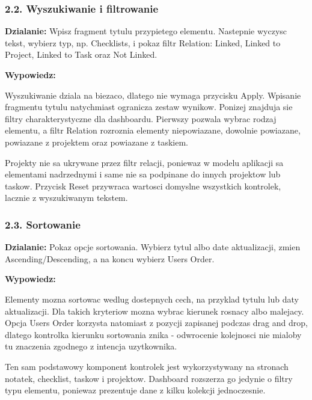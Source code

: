 \documentclass[
  polish,
  12pt,
  a4paper,
]{article}
\renewenvironment{quote}
  {\list{}{\leftmargin=1.2em\rightmargin=0.6em}%
   \item\relax\color{black}\setlength{\parskip}{0.7em}}
  {\endlist}
\begin{document}
\subsubsection{2.2. Wyszukiwanie i
filtrowanie}\label{22-wyszukiwanie-i-filtrowanie}

\textbf{Dzialanie:} Wpisz fragment tytulu przypietego elementu.
Nastepnie wyczysc tekst, wybierz typ, np. Checklists, i pokaz filtr
Relation: Linked, Linked to Project, Linked to Task oraz Not Linked.

\textbf{Wypowiedz:}

\begin{quote}
Wyszukiwanie dziala na biezaco, dlatego nie wymaga przycisku Apply.
Wpisanie fragmentu tytulu natychmiast ogranicza zestaw wynikow. Ponizej
znajduja sie filtry charakterystyczne dla dashboardu. Pierwszy pozwala
wybrac rodzaj elementu, a filtr Relation rozroznia elementy
niepowiazane, dowolnie powiazane, powiazane z projektem oraz powiazane z
taskiem.

Projekty nie sa ukrywane przez filtr relacji, poniewaz w modelu
aplikacji sa elementami nadrzednymi i same nie sa podpinane do innych
projektow lub taskow. Przycisk Reset przywraca wartosci domyslne
wszystkich kontrolek, lacznie z wyszukiwanym tekstem.
\end{quote}

\subsubsection{2.3. Sortowanie}\label{23-sortowanie}

\textbf{Dzialanie:} Pokaz opcje sortowania. Wybierz tytul albo date
aktualizacji, zmien Ascending/\allowbreak Descending, a na koncu wybierz
User\textquotesingle s Order.

\textbf{Wypowiedz:}

\begin{quote}
Elementy mozna sortowac wedlug dostepnych cech, na przyklad tytulu lub
daty aktualizacji. Dla takich kryteriow mozna wybrac kierunek rosnacy
albo malejacy. Opcja User\textquotesingle s Order korzysta natomiast z
pozycji zapisanej podczas drag and drop, dlatego kontrolka kierunku
sortowania znika - odwrocenie kolejnosci nie mialoby tu znaczenia
zgodnego z intencja uzytkownika.

Ten sam podstawowy komponent kontrolek jest wykorzystywany na stronach
notatek, checklist, taskow i projektow. Dashboard rozszerza go jedynie o
filtry typu elementu, poniewaz prezentuje dane z kilku kolekcji
jednoczesnie.
\end{quote}
\end{document}
